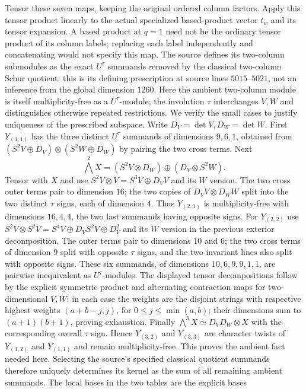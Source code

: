 Tensor these seven maps, keeping the original ordered column
factors. Apply this tensor product linearly to the actual
specialized based-product vector $t_w$ and its tensor
expansion. A based product at $q=1$ need not be the ordinary
tensor product of its column labels; replacing each label
independently and concatenating would not specify this map.
The source defines its two-column submodules as
the exact $U^\tau$ summands removed by the classical
two-column Schur quotient: this is its defining prescription
at source lines $5015$--$5021$, not an inference from the
global dimension $1260$. Here the ambient two-column module
is itself multiplicity-free as a $U^\tau$-module; the
involution $\tau$ interchanges $V,W$ and distinguishes
otherwise repeated restrictions. We verify the small cases
to justify uniqueness of the prescribed subspace. Write
$D_V=\det V,D_W=\det W$. First
$Y_{(1,1)}$ has the three distinct $U^\tau$ summands of
dimensions $9,6,1$, obtained from
$(S^2V\oplus D_V)\otimes(S^2W\oplus D_W)$ by pairing
the two cross terms. Next
\[
 \bigwedge^2X=(S^2V\otimes D_W)
                 \oplus(D_V\otimes S^2W).
\]
Tensor with $X$ and use
$S^2V\otimes V=S^3V\oplus D_VV$ and its $W$ version.
The two cross outer terms pair to dimension $16$; the
two copies of $D_VV\otimes D_WW$ split into the two
distinct $\tau$ signs, each of dimension $4$.
Thus $Y_{(2,1)}$ is multiplicity-free with dimensions
$16,4,4$, the two last summands having opposite signs.
For $Y_{(2,2)}$ use
$S^2V\otimes S^2V=S^4V\oplus D_VS^2V\oplus D_V^2$
and its $W$ version in the previous exterior decomposition.
The outer terms pair to dimensions $10$ and $6$;
the two cross terms of dimension $9$ split with opposite
$\tau$ signs, and the two invariant lines also split
with opposite signs. These six summands, of dimensions
$10,6,9,9,1,1$, are pairwise inequivalent as
$U^\tau$-modules. The displayed tensor decompositions
follow by the explicit symmetric product and alternating
contraction maps for two-dimensional $V,W$: in each
case the weights are the disjoint strings with respective
highest weights $(a+b-j,j)$, for $0\le j\le\min(a,b)$;
their dimensions sum to $(a+1)(b+1)$, proving exhaustion.
Finally $\bigwedge^3X\simeq D_VD_W\otimes X$ with
the corresponding overall $\tau$ sign. Hence
$Y_{(3,2)}$ and $Y_{(3,3)}$ are character twists of
$Y_{(1,2)}$ and $Y_{(1,1)}$ and remain
multiplicity-free. This proves the ambient fact needed
here. Selecting the source's specified classical
quotient summands therefore uniquely determines its
kernel as the sum of all remaining ambient summands.
The local bases in the two tables are the explicit bases
